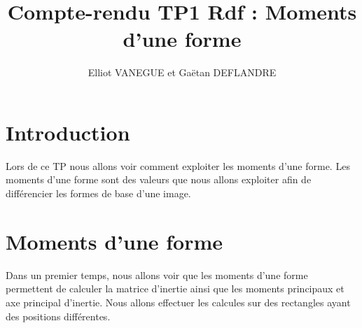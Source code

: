 \documentclass{article}
\title{Compte-rendu TP1 Rdf : Moments d'une forme}
\author{Elliot VANEGUE et Gaëtan DEFLANDRE}
\begin{document}


  \maketitle
  
  \mbox{}
  \newpage
  \clearpage
  
  \section{Introduction}
  Lors de ce TP nous allons voir comment exploiter les moments d'une forme. Les moments
  d'une forme sont des valeurs que nous allons exploiter afin de différencier les formes
  de base d'une image.
  
  \section{Moments d'une forme}
  Dans un premier temps, nous allons voir que les moments d'une forme permettent de calculer 
  la matrice d'inertie ainsi que les moments principaux et axe principal d'inertie. 
  Nous allons effectuer les calcules sur des rectangles ayant des positions différentes.\\
  
\end{document}
